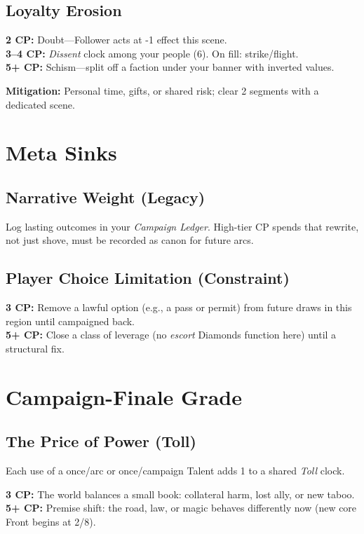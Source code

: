 \subsection{Loyalty Erosion}
\begin{tcolorbox}[enhanced,sharp corners,boxrule=.6pt,title={CP Menu}]
\textbf{2 CP:} Doubt—Follower acts at -1 effect this scene.\\
\textbf{3--4 CP:} \emph{Dissent} clock among your people (6). On fill: strike/flight.\\
\textbf{5+ CP:} Schism—split off a faction under your banner with inverted values.
\end{tcolorbox}
\textbf{Mitigation:} Personal time, gifts, or shared risk; clear 2 segments with a dedicated scene.

\section{Meta Sinks}
\subsection{Narrative Weight (Legacy)}
\begin{tcolorbox}[enhanced,sharp corners,boxrule=.6pt,title={Rule}]
Log lasting outcomes in your \emph{Campaign Ledger}. High-tier CP spends that \/rewrite\/, not just shove, must be recorded as canon for future arcs.
\end{tcolorbox}

\subsection{Player Choice Limitation (Constraint)}
\begin{tcolorbox}[enhanced,sharp corners,boxrule=.6pt,title={CP Menu}]
\textbf{3 CP:} Remove a lawful option (e.g., a pass or permit) from future draws in this region until campaigned back.\\
\textbf{5+ CP:} Close a class of leverage (no \emph{escort} Diamonds function here) until a structural fix.
\end{tcolorbox}

\section{Campaign-Finale Grade}
\subsection{The Price of Power (Toll)}
Each use of a once/arc or once/campaign Talent adds 1 to a shared \emph{Toll} clock.
\begin{tcolorbox}[enhanced,sharp corners,boxrule=.6pt,title={CP Menu}]
\textbf{3 CP:} The world balances a small book: collateral harm, lost ally, or new taboo.\\
\textbf{5+ CP:} Premise shift: the road, law, or magic behaves differently now (new core Front begins at 2/8).
\end{tcolorbox}

